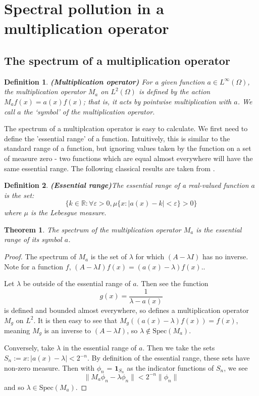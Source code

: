 \documentclass{article}
\newcommand{\Spec}{\text{Spec}}
\newcommand{\1}{\mathbf{1}}
\newtheorem{definition}{Definition}[section]
\newtheorem{theorem}{Theorem}[section]
\begin{document}
\section{Spectral pollution in a multiplication operator}
\subsection{The spectrum of a multiplication operator}
\begin{definition}{\textbf{(Multiplication operator)}}
For a given function $a \in L^\infty(\Omega)$, the multiplication operator $M_a$ on $L^2(\Omega)$ is defined by
the action $M_af(x) = a(x)f(x)$; that is, it acts by pointwise multiplication with $a$. We call $a$ the `symbol' of
the multiplication operator.
\end{definition}

The spectrum of a multiplcation operator is easy to calculate. We first
need to define the 'essential range' of a function. Intuitively, this is
similar to the standard range of a function, but ignoring values taken by
the function on a set of measure zero - two functions which are equal
almost everywhere will have the same essential range.
The following classical results are taken from \cite{davies1995spectral}.

\begin{definition}{\textbf{(Essential range)}}\label{defn:essential-range}
  The essential range of a real-valued function $a$ is the set:
  $$\{k \in \mathbb{R} : \forall \varepsilon > 0, \mu\{x : |a(x) - k| < \varepsilon\} > 0\}$$
  where $\mu$ is the Lebesgue measure.
\end{definition}

\begin{theorem}\label{thm:mult-op-spec}
  The spectrum of the multiplication operator $M_a$ is the essential range of its symbol $a$.
\end{theorem}
\begin{proof}
  The spectrum of $M_a$ is the set of $\lambda$ for which $(A - \lambda I)$ has no inverse. Note
  for a function $f$, $(A - \lambda I)f(x) = (a(x) - \lambda)f(x).$.

  Let $\lambda$ be outside of the essential range of $a$. Then see the function
  $$g(x) = \frac{1}{\lambda - a(x)}$$
  is defined and bounded almost everywhere, so defines a multiplication operator $M_g$ on $L^2$.
  It is then easy to see that $M_g((a(x) - \lambda)f(x)) = f(x)$, meaning
  $M_g$ is an inverse to $(A - \lambda I)$, so $\lambda \notin \Spec(M_a)$.

  Conversely, take $\lambda$ in the essential range of $a$. Then we take the sets
  $S_n := {x: |a(x) - \lambda| < 2^{-n}}$. By definition of the essential range,
  these sets have non-zero measure. Then with $\phi_n$ = $\1_{S_n}$ as the indicator
  functions of $S_n$, we see
  $$\|M_a\phi_n - \lambda \phi_n\| < 2^{-n}\|\phi_n\|$$
  and so $\lambda \in \Spec(M_a)$.
\end{proof}
\end{document}
